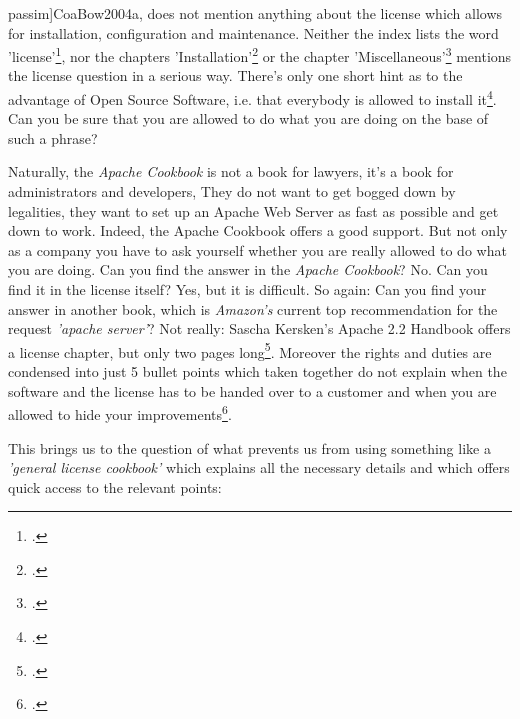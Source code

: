 passim]{CoaBow2004a}, does not mention anything about the license which allows
for installation, configuration and maintenance. Neither the index lists the
word 'license'\footcite[cf.][245ff, esp. p. 250]{CoaBow2004a}, nor the chapters
'Installation'\footcite[cf.][1ff]{CoaBow2004a} or the chapter
'Miscellaneous'\footcite[cf.][219ff]{CoaBow2004a} mentions the license question
in a serious way. There's only one short hint as to the advantage of Open Source
Software, i.e. that everybody is allowed to install it\footcite[cf.][1: \glqq{}
\ldots einer der Vorzüge von Open Source Software besteht darin, dass
je\-der\-mann die Erlaubnis zur Erzeugung eines eigenen Installationskits hat
\grqq{}]{CoaBow2004a}. Can you be sure that you are allowed to do what you are
doing on the base of such a phrase?

Naturally, the \emph{Apache Cookbook} is not a book for lawyers, it's a book for
administrators and developers, They do not want to get bogged down by
legalities, they want to set up an Apache Web Server as fast as possible and get
down to work. Indeed, the Apache Cookbook offers a good support. But not only as
a company you have to ask yourself whether you are really allowed to do what you
are doing. Can you find the answer in the \emph{Apache Cookbook}? No. Can you
find it in the license itself? Yes, but it is difficult. So again: Can you find your answer in another book, which is
\emph{Amazon's} current top recommendation for the request \emph{'apache
server'}? Not
really: Sascha Kersken's Apache 2.2 Handbook offers a license chapter, but only
two pages long\footcite[cf.][111f]{Kersken2009a}. Moreover the rights and duties
are condensed into just 5 bullet points which taken together do not explain when
the software and the license has to be handed over to a customer and when you
are allowed to hide your improvements\footcite[cf.][112]{Kersken2009a}.

This brings us to the question of what prevents us from using something like a
\emph{'general license cookbook'} which explains all the necessary details and which
offers  quick access to the relevant points:

%
